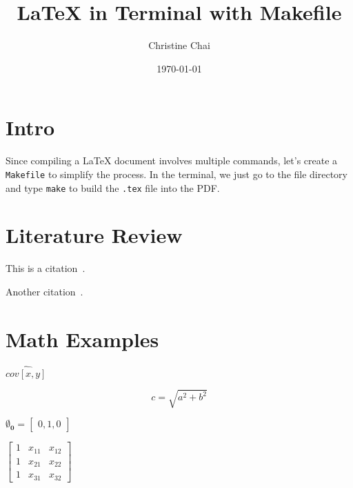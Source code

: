 \documentclass{article}
\title{LaTeX in Terminal with Makefile}
\author{Christine Chai}
\date{\today}
\begin{document}
\maketitle

\section{Intro}

Since compiling a LaTeX document involves multiple commands, let's create a \texttt{Makefile} to simplify the process. In the terminal, we just go to the file directory and type \texttt{make} to build the \texttt{.tex} file into the PDF. 

\section{Literature Review}

This is a citation~\cite{stamatatos2011plagiarism}.

Another citation~\cite{sanchez2019paraphrase}.


\section{Math Examples}

$\hat{cov[x,y]}$

$$c = \sqrt{a^2 + b^2}$$

\(\mathbf{\emptyset_0} =\begin{bmatrix}0,1,0\end{bmatrix}\)

$\begin{bmatrix} 1 & x_{11} & x_{12}\\ 1 & x_{21} & x_{22} \\ 1 & x_{31} & x_{32} \end{bmatrix}$



\end{document}
